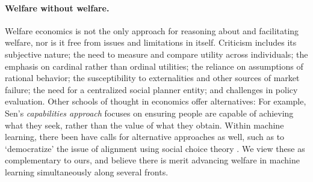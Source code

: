 \paragraph{Welfare without welfare.}
Welfare economics is not the only approach for reasoning about and facilitating welfare,
nor is it free from issues and limitations in itself.
Criticism includes
its subjective nature;
the need to measure and compare utility across individuals; 
the emphasis on cardinal rather than ordinal utilities;%
the reliance on assumptions of rational behavior; 
the susceptibility to externalities and other sources of market failure; 
the need for a centralized social planner entity;
and challenges in policy evaluation.
Other schools of thought in economics offer alternatives:
For example, Sen's \emph{capabilities approach}
\citep{sen1999commodities}
focuses on ensuring people are capable of achieving what they seek,
rather than the value of what they obtain.
Within machine learning, there been have calls for alternative approaches as well,
such as to `democratize' the issue of alignment using social choice theory
\citep{conitzer2024position,ge2024axioms,fish2024generative}.
We view these as complementary to ours,
and believe there is merit advancing welfare in machine learning
simultaneously along several fronts.
\squeeze







